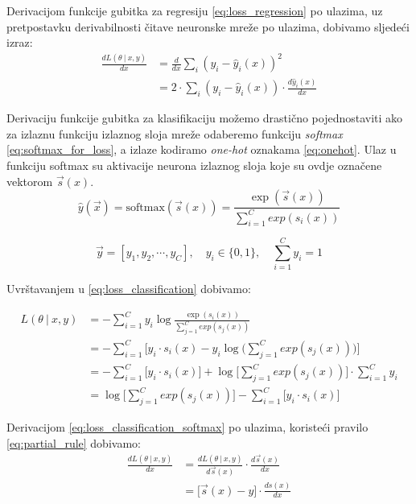 \documentclass[times, utf8, diplomski]{fer}
\def\dfrac#1#2{\frac{d #1}{d #2}}
\def\probsep{\ |\ }
\begin{document}
Derivacijom funkcije gubitka za regresiju \eqref{eq:loss_regression} po ulazima, uz pretpostavku derivabilnosti čitave neuronske mreže po ulazima, dobivamo sljedeći izraz:
\begin{align}
\dfrac{L(\theta \probsep x,y)}{x} &= \dfrac{}{x}\sum_i(y_i - \hat{y}_i(x))^2 \nonumber \\
&= 2 \cdot \sum_i (y_i - \hat{y}_i(x)) \cdot \dfrac{\hat{y}_i(x)}{x}
\end{align}

Derivaciju funkcije gubitka za klasifikaciju možemo drastično pojednostaviti ako za izlaznu funkciju izlaznog sloja mreže odaberemo funkciju \textit{softmax} \eqref{eq:softmax_for_loss}, a izlaze kodiramo \textit{one-hot} oznakama \eqref{eq:onehot}. Ulaz u funkciju softmax su aktivacije neurona izlaznog sloja koje su ovdje označene vektorom $\vec{s}(x)$.
\begin{equation}
\label{eq:softmax_for_loss}
\hat{y}(\vec{x}) = \text{softmax}(\vec{s}(x)) = \frac{\exp(\vec{s}(x))}{\sum_{i=1}^{C} exp(s_i(x))}
\end{equation}

\begin{equation}
\label{eq:onehot}
\vec{y}=[y_1, y_2, \cdots, y_C], \quad y_i \in \{0,1\}, \quad \sum_{i=1}^C y_i = 1
\end{equation}

Uvrštavanjem u \eqref{eq:loss_classification} dobivamo:

\begin{align}
\label{eq:loss_classification_softmax}
L(\theta \probsep x,y) &= - \sum_{i=1}^C y_i \log \frac{\exp(s_i(x))}{\sum_{j=1}^{C} exp(s_j(x))} \nonumber \\
&= - \sum_{i=1}^C \bigg[ y_i \cdot s_i(x) - y_i \log\big(\sum_{j=1}^{C} exp(s_j(x))\big) \bigg] \nonumber \\
&= - \sum_{i=1}^C \big[ y_i \cdot s_i(x) \big] + \log\big[\sum_{j=1}^{C} exp(s_j(x))\big] \cdot \sum_{i=1}^C y_i \nonumber \\
&= \log\big[\sum_{j=1}^{C} exp(s_j(x))\big] - \sum_{i=1}^C \big[ y_i \cdot s_i(x) \big]
\end{align}

Derivacijom \eqref{eq:loss_classification_softmax} po ulazima, koristeći pravilo \eqref{eq:partial_rule} dobivamo:
\begin{align}
\dfrac{L(\theta \probsep x,y)}{x} &= \dfrac{L(\theta \probsep x,y)}{\vec{s}(x)} \cdot \dfrac{\vec{s}(x)}{x} \nonumber \\
&= \bigg[ \vec{s}(x) - y \bigg] \cdot \dfrac{s(x)}{x}
\end{align}
\end{document}
